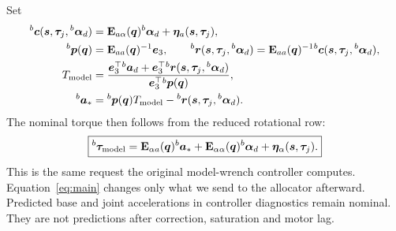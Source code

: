 \documentclass[11pt,a4paper]{article}
\newcommand{\vct}[1]{\boldsymbol{#1}}
\newcommand{\mat}[1]{\mathbf{#1}}
\newcommand{\bv}[1]{{}^{b}\vct{#1}}
\newcommand{\e}{\vct e_3}
\begin{document}
Set
\begin{equation}
\begin{aligned}
\bv c(\vct s,\vct\tau_j,\bv\alpha_d)&=
\mat E_{a\alpha}(\vct q)\bv\alpha_d+\vct\eta_a(\vct s,\vct\tau_j),\\
\bv p(\vct q)&=\mat E_{aa}(\vct q)^{-1}\e,\qquad
\bv r(\vct s,\vct\tau_j,\bv\alpha_d)=
\mat E_{aa}(\vct q)^{-1}\bv c(\vct s,\vct\tau_j,\bv\alpha_d),\\
T_{\rm model}&=\frac{\e^\top\bv a_d+
\e^\top\bv r(\vct s,\vct\tau_j,\bv\alpha_d)}{\e^\top\bv p(\vct q)},\\
\bv a_*&=\bv p(\vct q)T_{\rm model}-
\bv r(\vct s,\vct\tau_j,\bv\alpha_d).
\end{aligned}\label{eq:forcesolve}
\end{equation}
The nominal torque then follows from the reduced rotational row:
\begin{equation}
\boxed{\bv\tau_{\rm model}=
\mat E_{\alpha a}(\vct q)\bv a_*
+\mat E_{\alpha\alpha}(\vct q)\bv\alpha_d
+\vct\eta_\alpha(\vct s,\vct\tau_j).}
\label{eq:nominaltorque}
\end{equation}
This is the same request the original model-wrench controller computes.
Equation~\eqref{eq:main} changes only what we send to the allocator afterward.
Predicted base and joint accelerations in controller diagnostics remain nominal.
They are not predictions after correction, saturation and motor lag.
\end{document}
